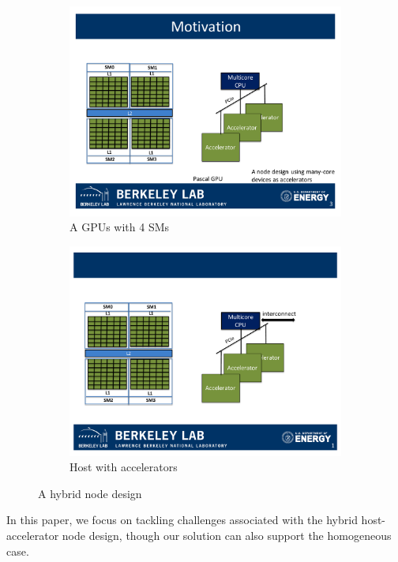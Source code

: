 \begin{figure}[htb]
\centering
\begin{subfigure}[b]{0.22\textwidth}
\includegraphics[width=\textwidth]{figures/SMs.pdf}
\caption{A GPUs with 4 SMs}
\label{SMs}
\end{subfigure}
\begin{subfigure}[b]{0.2\textwidth}
\includegraphics[width=\textwidth]{figures/host_accelerator.pdf}
\caption{Host with accelerators}
\label{hybrid}
\end{subfigure}
\caption{A hybrid node design}
\label{fig:sysArch}
\end{figure}


In this paper, we focus on tackling challenges associated with the hybrid host-accelerator node design, though our solution can also support the homogeneous case.
